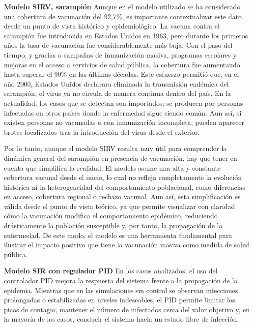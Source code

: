 \vspace{2em}

\textbf{Modelo SIRV, sarampión} Aunque en el modelo utilizado se ha considerado una cobertura de vacunación del 92,7\%, es importante contextualizar este dato desde un punto de vista histórico y epidemiológico. La vacuna contra el sarampión fue introducida en Estados Unidos en 1963, pero durante los primeros años la tasa de vacunación fue considerablemente más baja. Con el paso del tiempo, y gracias a campañas de inmunización masiva, programas escolares y mejoras en el acceso a servicios de salud pública, la cobertura fue aumentando hasta superar el 90\% en las últimas décadas.
Este esfuerzo permitió que, en el año 2000, Estados Unidos declarara eliminada la transmisión endémica del sarampión, el virus ya no circula de manera continua dentro del país. En la actualidad, los casos que se detectan son importados: se producen por personas infectadas en otros países donde la enfermedad sigue siendo común. Aun así, si existen personas no vacunadas o con inmunización incompleta, pueden aparecer brotes localizados tras la introducción del virus desde el exterior.

Por lo tanto, aunque el modelo SIRV resulta muy útil para comprender la dinámica general del sarampión en presencia de vacunación, hay que tener en cuenta que simplifica la realidad. El modelo asume una alta y constante cobertura vacunal desde el inicio, lo cual no refleja completamente la evolución histórica ni la heterogeneidad del comportamiento poblacional, como diferencias en acceso, cobertura regional o rechazo vacunal.
Aun así, esta simplificación es válida desde el punto de vista teórico, ya que permite visualizar con claridad cómo la vacunación modifica el comportamiento epidémico, reduciendo drásticamente la población susceptible y, por tanto, la propagación de la enfermedad. De este modo, el modelo es una herramienta fundamental para ilustrar el impacto positivo que tiene la vacunación masiva como medida de salud pública.

\vspace{2em}


\vspace{2em}
\textbf{Modelo SIR con regulador PID}
En los casos analizados, el uso del controlador PID mejora la respuesta del sistema frente a la propagación de la epidemia. Mientras que en las simulaciones sin control se observan infecciones prolongadas o estabilizadas en niveles indeseables, el PID permite limitar los picos de contagio, mantener el número de infectados cerca del valor objetivo y, en la mayoría de los casos, conducir el sistema hacia un estado libre de infección.

